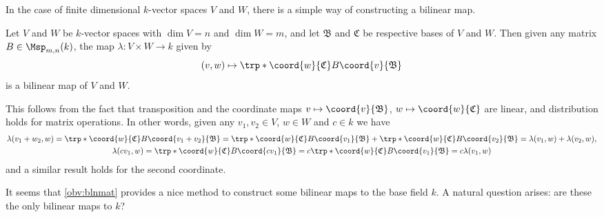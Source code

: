 In the case of finite dimensional \(k\)-vector spaces \(V\) and \(W\),
there is a simple way of constructing a bilinear map.

\begin{observation}
    \label{obv:blnmat}
    Let \(V\) and \(W\) be \(k\)-vector spaces
    with \(\dim V=n\) and \(\dim W=m\),
    and let \(\mathfrak B\) and \(\mathfrak C\) be respective bases
    of \(V\) and \(W\).
    Then given any matrix \(B\in\Msp_{m,n}(k)\),
    the map \(\lambda:V\times W\to k\) given by
    \[
        (v,w)\mapsto\trp*{\coord{w}{\mathfrak C}}B\coord{v}{\mathfrak B}
    \]
    is a bilinear map of \(V\) and \(W\).
\end{observation}
\begin{myproof}
    This follows from the fact that
    transposition and the coordinate maps
    \(v\mapsto\coord{v}{\mathfrak B}\),
    \(w\mapsto\coord{w}{\mathfrak C}\) are linear,
    and distribution holds for matrix operations.
    In other words,
    given any \(v_1,v_2\in V\), \(w\in W\) and \(c\in k\) we have
    \begin{gather*}
        \lambda(v_1+w_2,w)
        =\trp*{\coord{w}{\mathfrak C}}B\coord{v_1+v_2}{\mathfrak B}
        =\trp*{\coord{w}{\mathfrak C}}B\coord{v_1}{\mathfrak B}
            +\trp*{\coord{w}{\mathfrak C}}B\coord{v_2}{\mathfrak B}
        =\lambda(v_1,w)+\lambda(v_2,w), \\
        \lambda(cv_1,w)
        =\trp*{\coord{w}{\mathfrak C}}B\coord{cv_1}{\mathfrak B}
        =c\trp*{\coord{w}{\mathfrak C}}B\coord{v_1}{\mathfrak B}
        =c\lambda(v_1,w)
    \end{gather*}
    and a similar result holds for the second coordinate.
\end{myproof}

It seems that \cref{obv:blnmat} provides a nice method
to construct some bilinear maps to the base field \(k\).
A natural question arises:
are these the only bilinear maps to \(k\)?

